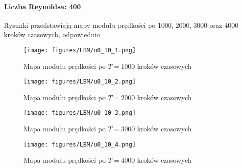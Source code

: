 \documentclass[12pt]{article}
\begin{document}
\paragraph{Liczba Reynoldsa: 400}
Rysunki przedstawiają mapy modułu prędkości po 1000, 2000, 3000 oraz 4000 kroków czasowych, odpowiednio 
\begin{figure}[H]
	\texttt{[image: figures/LBM/u0\_10\_1.png]} 
	\caption{Mapa modułu prędkości po $ T=1000 $ kroków czasowych}
\end{figure}
\begin{figure}[H]
	\texttt{[image: figures/LBM/u0\_10\_2.png]} 
	\caption{Mapa modułu prędkości po $ T=2000 $ kroków czasowych}
\end{figure}
\begin{figure}[H]
	\texttt{[image: figures/LBM/u0\_10\_3.png]} 
	\caption{Mapa modułu prędkości po $ T=3000 $ kroków czasowych}
\end{figure}
\begin{figure}[H]
	\texttt{[image: figures/LBM/u0\_10\_4.png]} 
	\caption{Mapa modułu prędkości po $ T=4000 $ kroków czasowych}
\end{figure}
\end{document}

